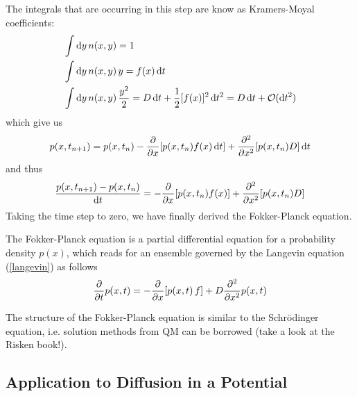 \documentclass{notebook}
\begin{document}
%
The integrals that are occurring in this step are know as Kramers-Moyal coefficients:
%
\begin{align*}
	&\int \dd{y} n(x,y) = 1 \\
	&\int \dd{y} n(x,y) \, y = f(x) \dd{t} \\
	&\int \dd{y} n(x,y) \, \frac{y^2}{2} = D \dd{t} + \frac{1}{2}[f(x)]^2 \dd{t^2} = D \dd{t} + \mathcal{O}(\dd{t}^2)
\end{align*}
%
which give us
%
\begin{equation}
p(x,t_{n+1}) = p(x,t_n) - \pdv{x} [p(x,t_n) f(x) \dd{t}] + \pdv[2]{x}[p(x,t_n) D]\dd{t}
\end{equation}
%
and thus
%
\begin{equation}
\frac{p(x,t_{n+1}) - p(x,t_n)}{\dd{t}} =  -\pdv{x} [p(x,t_n) f(x)] + \pdv[2]{x}[p(x,t_n) D]
\end{equation}
%
Taking the time step to zero, we have finally derived the Fokker-Planck equation.
%
\begin{theorem}
	The Fokker-Planck equation is a partial differential equation for a probability density $p(x)$, which reads for an ensemble governed by the Langevin equation (\ref{langevin}) as follows
	\begin{equation}
	\pdv{t} p(x,t) = -\pdv{x}[p(x,t) \, f] + D \pdv[2]{x} p(x,t)
	\end{equation}
\end{theorem}
%
The structure of the Fokker-Planck equation is similar to the Schrödinger equation, i.e. solution methods from QM can be borrowed (take a look at the Risken book!). 

\subsection*{Application to Diffusion in a Potential}
\end{document}

